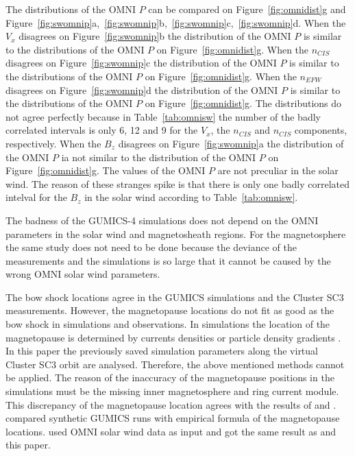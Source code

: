 \documentclass[linenumbers,draft]{agujournal}
\begin{document}
The distributions of the OMNI $P$ can be compared on Figure~\ref{fig:omnidist}g and Figure~\ref{fig:swomnip}a,~\ref{fig:swomnip}b,~\ref{fig:swomnip}c,~\ref{fig:swomnip}d. When the $V_{x}$ disagrees on Figure~\ref{fig:swomnip}b the distribution of the OMNI $P$ is similar to the distributions of the OMNI $P$ on Figure~\ref{fig:omnidist}g. When the $n_{CIS}$ disagrees on Figure~\ref{fig:swomnip}c the distribution of the OMNI $P$ is similar to the distributions of the OMNI $P$ on Figure~\ref{fig:omnidist}g. When the $n_{EFW}$ disagrees on Figure~\ref{fig:swomnip}d the distribution of the OMNI $P$ is similar to the distributions of the OMNI $P$ on Figure~\ref{fig:omnidist}g. The distributions do not agree perfectly because in Table~\ref{tab:omnisw} the number of the badly correlated intervals is only 6, 12 and 9 for the $V_{x}$, the $n_{CIS}$ and $n_{CIS}$ components, respectively. When the $B_{z}$ disagrees on Figure~\ref{fig:swomnip}a the distribution of the OMNI $P$ ia not similar to the distribution of the OMNI $P$ on Figure~\ref{fig:omnidist}g. The values of the OMNI $P$ are not preculiar in the solar wind. The reason of these stranges spike is that there is only one badly correlated intelval for the $B_{z}$ in the solar wind according to Table~\ref{tab:omnisw}.


The badness of the GUMICS-4 simulations does not depend on the OMNI parameters in the solar wind and magnetosheath regions. For the magnetosphere the same study does not need to be done because the deviance of the measurements and the simulations is so large that it cannot be caused by the wrong OMNI solar wind parameters.


The bow shock locations agree in the GUMICS simulations and the Cluster SC3 measurements. However, the magnetopause locations do not fit as good as the bow shock in simulations and observations. In simulations the location of the magnetopause is determined by currents densities or particle density gradients \citep[][see references therein]{garcia07:_findin_lyon_fedder_mobar,gordeev13:_verif_gumic_mhd}. In this paper the previously saved simulation parameters along the virtual Cluster SC3 orbit are analysed. Therefore, the above mentioned methods cannot be applied. The reason of the inaccuracy of the magnetopause positions in the simulations must be the missing inner magnetosphere and ring current module. This discrepancy of the magnetopause location agrees with the results of \citet{gordeev13:_verif_gumic_mhd} and \citet{facsko16:_one_earth}. \citet{gordeev13:_verif_gumic_mhd} compared synthetic GUMICS runs with empirical formula of the magnetopause locations. \citet{facsko16:_one_earth} used OMNI solar wind data as input and got the same result as \citet{gordeev13:_verif_gumic_mhd} and this paper.
\end{document}

